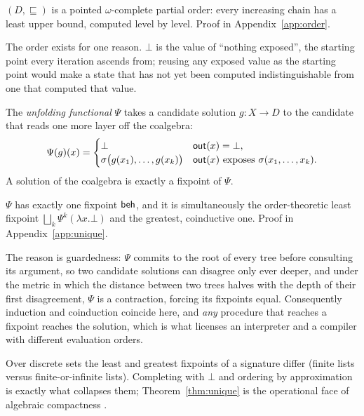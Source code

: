 \begin{proposition}\label{prop:order}
  $(D, \sqsubseteq)$ is a pointed $\omega$-complete partial order: every increasing chain has
  a least upper bound, computed level by level. Proof in Appendix~\ref{app:order}.
\end{proposition}

The order exists for one reason. $\bot$ is the value of ``nothing exposed'', the starting
point every iteration ascends from; reusing any exposed value as the starting point would
make a state that has not yet been computed indistinguishable from one that computed that
value.

\begin{definition}\label{def:unfolding}
  The \emph{unfolding functional} $\Psi$ takes a candidate solution $g \colon X \to D$ to the
  candidate that reads one more layer off the coalgebra:
  \[
    \Psi(g)(x) =
    \begin{cases}
      \bot & \mathsf{out}(x) = \bot,\\
      \sigma\big(g(x_1), \dots, g(x_k)\big) & \mathsf{out}(x) \text{ exposes } \sigma(x_1, \dots, x_k).
    \end{cases}
  \]
  A solution of the coalgebra is exactly a fixpoint of $\Psi$.
\end{definition}

\begin{theorem}\label{thm:unique}
  $\Psi$ has exactly one fixpoint $\mathsf{beh}$, and it is simultaneously the order-theoretic least
  fixpoint $\bigsqcup_k \Psi^k(\lambda x.\bot)$ and the greatest, coinductive one. Proof in
  Appendix~\ref{app:unique}.
\end{theorem}

\noindent
The reason is guardedness: $\Psi$ commits to the root of every tree before consulting its
argument, so two candidate solutions can disagree only ever deeper, and under the metric in
which the distance between two trees halves with the depth of their first disagreement, $\Psi$
is a contraction, forcing its fixpoints equal. Consequently induction and coinduction coincide here, and \emph{any}
procedure that reaches a fixpoint reaches the solution, which is what licenses an interpreter
and a compiler with different evaluation orders.

\begin{remark}\label{rem:compact}
  Over discrete sets the least and greatest fixpoints of a signature differ (finite lists
  versus finite-or-infinite lists). Completing with $\bot$ and ordering by approximation is
  exactly what collapses them; Theorem~\ref{thm:unique} is the operational face of algebraic
  compactness \cite{smyth1982-recursive-domain-equations, freyd1991-algebraically-complete-categories}.
\end{remark}

